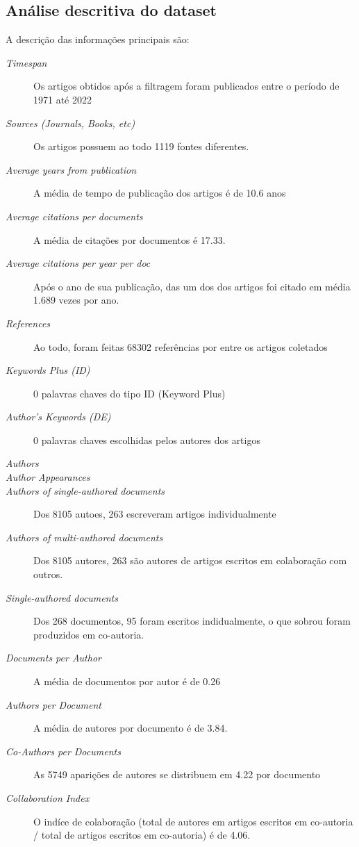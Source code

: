 \subsection{Análise descritiva do dataset}

A descrição das informações principais são:

\begin{description}
    \item [\textit{Timespan}] Os artigos obtidos após a filtragem foram publicados entre o período de 1971 até 2022
    \item [\textit{Sources (Journals, Books, etc)}] Os artigos possuem ao todo 1119 fontes diferentes.
    \item [\textit{Average years from publication}] A média de tempo de publicação dos artigos é de 10.6 anos
    \item [\textit{Average citations per documents}] A média de citações por documentos é 17.33.
    \item [\textit{Average citations per year per doc}] Após o ano de sua publicação, das um dos dos artigos foi citado em média 1.689 vezes por ano.
    \item [\textit{References}] Ao todo, foram feitas 68302 referências por entre os artigos coletados
    \item [\textit{Keywords Plus (ID)}] 0 palavras chaves do tipo ID (Keyword Plus)
    \item [\textit{Author's Keywords (DE)}]  0 palavras chaves escolhidas pelos autores dos artigos

    \item [\textit{Authors}]  
    \item [\textit{Author Appearances}] 
    \item [\textit{Authors of single-authored documents}] Dos 8105 autoes, 263 escreveram artigos individualmente
    \item [\textit{Authors of multi-authored documents}] Dos 8105 autores, 263 são autores de artigos escritos em colaboração com outros.
    \item [\textit{Single-authored documents}] Dos 268 documentos, 95 foram escritos indidualmente, o que sobrou foram produzidos em co-autoria.
    \item [\textit{Documents per Author}] A média de documentos por autor é de 0.26
    \item [\textit{Authors per Document}] A média de autores por documento é de 3.84.
    \item [\textit{Co-Authors per Documents}] As 5749 aparições de autores se distribuem em 4.22 por documento
    \item [\textit{Collaboration Index}] O indíce de colaboração (total de autores em artigos escritos em co-autoria / total de artigos escritos em co-autoria) é de 4.06.
\end{description}